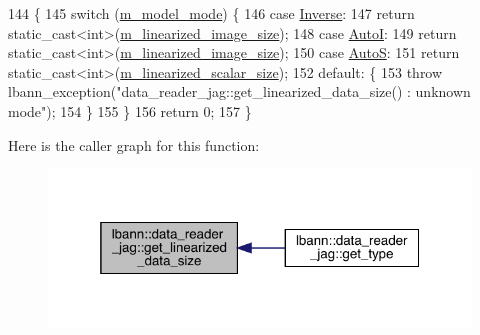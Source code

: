\begin{DoxyCode}
144                                                     \{
145   \textcolor{keywordflow}{switch} (\hyperlink{classlbann_1_1data__reader__jag_a877eb1f0eb2afccd73cd7d69407ff6e2}{m\_model\_mode}) \{
146     \textcolor{keywordflow}{case} \hyperlink{classlbann_1_1data__reader__jag_a114c369c8604df385cf7a3ec20c9739ba2d3bba9f202270762169c1c01d2fb7a4}{Inverse}:
147       \textcolor{keywordflow}{return} \textcolor{keyword}{static\_cast<}\textcolor{keywordtype}{int}\textcolor{keyword}{>}(\hyperlink{classlbann_1_1data__reader__jag_a7c2aa5f489e7c7a3236c1f6c4a760048}{m\_linearized\_image\_size});
148     \textcolor{keywordflow}{case} \hyperlink{classlbann_1_1data__reader__jag_a114c369c8604df385cf7a3ec20c9739bae9c49fc4443020e18086fc83ce0b369b}{AutoI}:
149       \textcolor{keywordflow}{return} \textcolor{keyword}{static\_cast<}\textcolor{keywordtype}{int}\textcolor{keyword}{>}(\hyperlink{classlbann_1_1data__reader__jag_a7c2aa5f489e7c7a3236c1f6c4a760048}{m\_linearized\_image\_size});
150     \textcolor{keywordflow}{case} \hyperlink{classlbann_1_1data__reader__jag_a114c369c8604df385cf7a3ec20c9739baab2b8e8bef02dfc8ffaae80bdd0a7fd4}{AutoS}:
151       \textcolor{keywordflow}{return} \textcolor{keyword}{static\_cast<}\textcolor{keywordtype}{int}\textcolor{keyword}{>}(\hyperlink{classlbann_1_1data__reader__jag_a856b4b9cdf9d8569e5fef1d5d996870d}{m\_linearized\_scalar\_size});
152     \textcolor{keywordflow}{default}: \{
153       \textcolor{keywordflow}{throw} lbann\_exception(\textcolor{stringliteral}{"data\_reader\_jag::get\_linearized\_data\_size() : unknown mode"});
154     \}
155   \}
156   \textcolor{keywordflow}{return} 0;
157 \}
\end{DoxyCode}
Here is the caller graph for this function\+:\nopagebreak
\begin{figure}[H]
\begin{center}
\leavevmode
\includegraphics[width=319pt]{classlbann_1_1data__reader__jag_aaf9fbe3e290dc1d4bb13fb203e33e313_icgraph}
\end{center}
\end{figure}
\mbox{\label{classlbann_1_1data__reader__jag_aab3760b1f7824e67f84ce486d3da399f}} 

